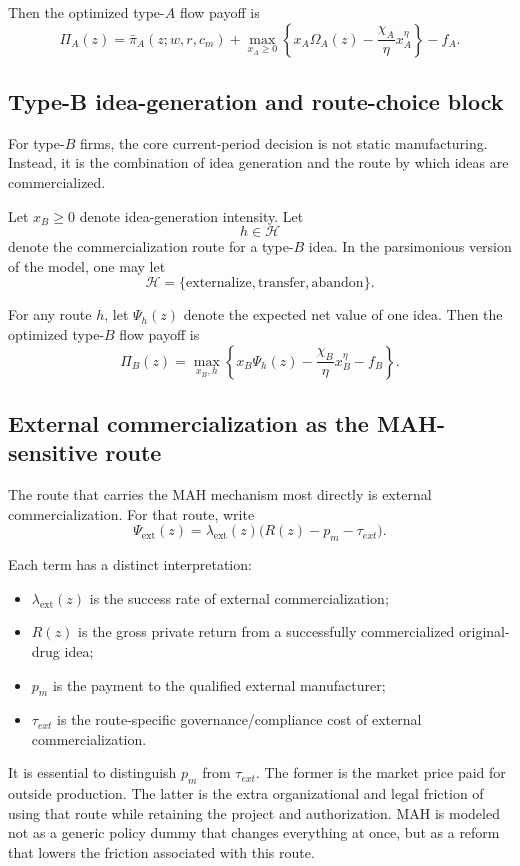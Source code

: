 \documentclass[12pt,fontset=none]{ctexart}
\begin{document}
Then the optimized type-$A$ flow payoff is
\[
\Pi_A(z)
=
\bar{\pi}_A(z;w,r,c_m)
+
\max_{x_A\ge 0}
\left\{
x_A\Omega_A(z)-\frac{\chi_A}{\eta}x_A^\eta
\right\}
-f_A.
\]

\subsection{Type-B idea-generation and route-choice block}

For type-$B$ firms, the core current-period decision is not static manufacturing.
Instead, it is the combination of idea generation and the route by which ideas
are commercialized.

Let $x_B\ge 0$ denote idea-generation intensity. Let
\[
h\in\mathcal{H}
\]
denote the commercialization route for a type-$B$ idea. In the parsimonious
version of the model, one may let
\[
\mathcal{H}=\{\text{externalize},\text{transfer},\text{abandon}\}.
\]

For any route $h$, let $\Psi_h(z)$ denote the expected net value of one idea.
Then the optimized type-$B$ flow payoff is
\[
\Pi_B(z)
=
\max_{x_B,h}
\left\{
x_B\Psi_h(z)-\frac{\chi_B}{\eta}x_B^\eta-f_B
\right\}.
\]

\subsection{External commercialization as the MAH-sensitive route}

The route that carries the MAH mechanism most directly is external commercialization.
For that route, write
\[
\Psi_{\mathrm{ext}}(z)
=
\lambda_{\mathrm{ext}}(z)\bigl(R(z)-p_m-\tau_{ext}\bigr).
\]

Each term has a distinct interpretation:

\begin{itemize}[leftmargin=2em]
    \item $\lambda_{\mathrm{ext}}(z)$ is the success rate of external commercialization;
    \item $R(z)$ is the gross private return from a successfully commercialized original-drug idea;
    \item $p_m$ is the payment to the qualified external manufacturer;
    \item $\tau_{ext}$ is the route-specific governance/compliance cost of external commercialization.
\end{itemize}

It is essential to distinguish $p_m$ from $\tau_{ext}$. The former is the market price
paid for outside production. The latter is the extra organizational and legal friction of
using that route while retaining the project and authorization. MAH is modeled not as
a generic policy dummy that changes everything at once, but as a reform that lowers
the friction associated with this route.
\end{document}

